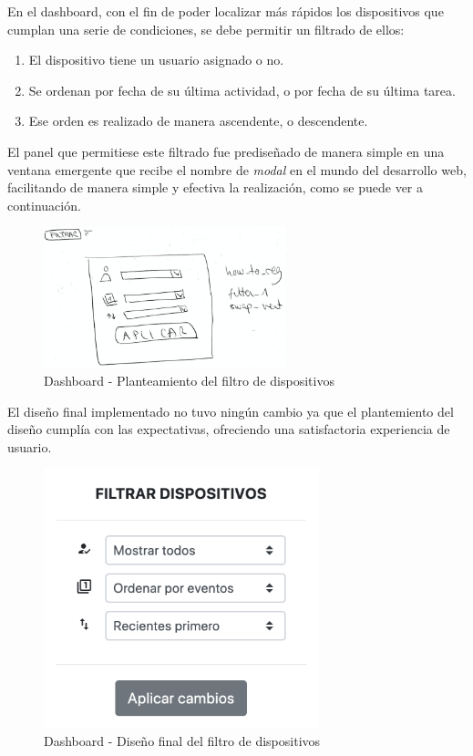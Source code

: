 \begin{enumerate}
    En el dashboard, con el fin de poder localizar más rápidos los dispositivos que cumplan una serie de condiciones, se debe permitir un filtrado de ellos:
    \begin{enumerate}
        \item El dispositivo tiene un usuario asignado o no.
        \item Se ordenan por fecha de su última actividad, o por fecha de su última tarea.
        \item Ese orden es realizado de manera ascendente, o descendente.
    \end{enumerate}
    
    El panel que permitiese este filtrado fue prediseñado de manera simple en una ventana emergente que recibe el nombre de \textit{modal} en el mundo del desarrollo web, facilitando de manera simple y efectiva la realización, como se puede ver a continuación.
    
    \begin{figure}[H]   
        \centering
        \includegraphics[width=7cm]{./img/web/devices/dev.filter.pre.png}
        \caption{Dashboard - Planteamiento del filtro de dispositivos}
        \label{fig:web.dir}
    \end{figure}
    
    El diseño final implementado no tuvo ningún cambio ya que el plantemiento del diseño cumplía con las expectativas, ofreciendo una satisfactoria experiencia de usuario.
    
    \begin{figure}[H]   
        \centering
        \includegraphics[width=8cm]{./img/web2/home.device.filter.png}
        \caption{Dashboard - Diseño final del filtro de dispositivos}
        \label{fig:web.dir}
    \end{figure}
    

\end{enumerate}
